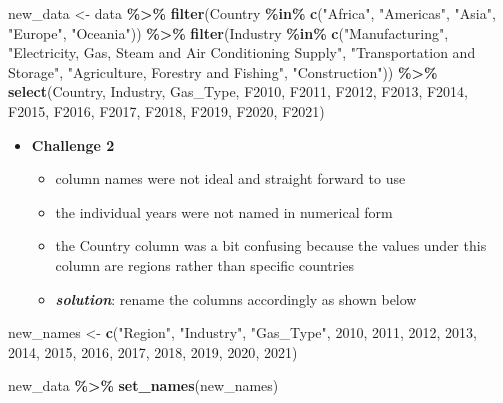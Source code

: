 \documentclass[
]{article}
\newenvironment{Shaded}{\begin{snugshade}}{\end{snugshade}}
\newcommand{\DecValTok}[1]{\textcolor[rgb]{0.00,0.00,0.81}{#1}}
\newcommand{\FunctionTok}[1]{\textcolor[rgb]{0.13,0.29,0.53}{\textbf{#1}}}
\newcommand{\NormalTok}[1]{#1}
\newcommand{\OtherTok}[1]{\textcolor[rgb]{0.56,0.35,0.01}{#1}}
\newcommand{\SpecialCharTok}[1]{\textcolor[rgb]{0.81,0.36,0.00}{\textbf{#1}}}
\newcommand{\StringTok}[1]{\textcolor[rgb]{0.31,0.60,0.02}{#1}}
\begin{document}
\begin{enumerate}
\begin{Shaded}
\begin{Highlighting}[]
\NormalTok{new\_data }\OtherTok{\textless{}{-}}\NormalTok{ data }\SpecialCharTok{\%\textgreater{}\%}
  \FunctionTok{filter}\NormalTok{(Country }\SpecialCharTok{\%in\%} \FunctionTok{c}\NormalTok{(}\StringTok{"Africa"}\NormalTok{, }\StringTok{"Americas"}\NormalTok{, }\StringTok{"Asia"}\NormalTok{, }\StringTok{"Europe"}\NormalTok{, }\StringTok{"Oceania"}\NormalTok{)) }\SpecialCharTok{\%\textgreater{}\%}
  \FunctionTok{filter}\NormalTok{(Industry }\SpecialCharTok{\%in\%} \FunctionTok{c}\NormalTok{(}\StringTok{"Manufacturing"}\NormalTok{, }\StringTok{"Electricity, Gas, }
\StringTok{                         Steam and Air Conditioning Supply"}\NormalTok{, }\StringTok{"Transportation and Storage"}\NormalTok{, }
                         \StringTok{"Agriculture, Forestry and Fishing"}\NormalTok{, }\StringTok{"Construction"}\NormalTok{)) }\SpecialCharTok{\%\textgreater{}\%}
  \FunctionTok{select}\NormalTok{(Country, Industry, Gas\_Type, F2010, F2011, F2012, F2013, F2014, F2015, }
\NormalTok{         F2016, F2017, F2018, F2019, F2020, F2021) }
\end{Highlighting}
\end{Shaded}

  \begin{itemize}
  \item
    \textbf{Challenge 2}

    \begin{itemize}
    \item
      column names were not ideal and straight forward to use
    \item
      the individual years were not named in numerical form
    \item
      the Country column was a bit confusing because the values under
      this column are regions rather than specific countries
    \item
      \textbf{\emph{solution}}: rename the columns accordingly as shown
      below
    \end{itemize}
  \end{itemize}

\begin{Shaded}
\begin{Highlighting}[]
\NormalTok{new\_names }\OtherTok{\textless{}{-}} \FunctionTok{c}\NormalTok{(}\StringTok{"Region"}\NormalTok{, }\StringTok{"Industry"}\NormalTok{, }\StringTok{"Gas\_Type"}\NormalTok{, }\DecValTok{2010}\NormalTok{, }\DecValTok{2011}\NormalTok{, }\DecValTok{2012}\NormalTok{, }\DecValTok{2013}\NormalTok{, }\DecValTok{2014}\NormalTok{, }\DecValTok{2015}\NormalTok{, }
               \DecValTok{2016}\NormalTok{, }\DecValTok{2017}\NormalTok{, }\DecValTok{2018}\NormalTok{, }\DecValTok{2019}\NormalTok{, }\DecValTok{2020}\NormalTok{, }\DecValTok{2021}\NormalTok{)}

\NormalTok{new\_data }\SpecialCharTok{\%\textgreater{}\%} \FunctionTok{set\_names}\NormalTok{(new\_names)}
\end{Highlighting}
\end{Shaded}
\end{enumerate}
\end{document}
